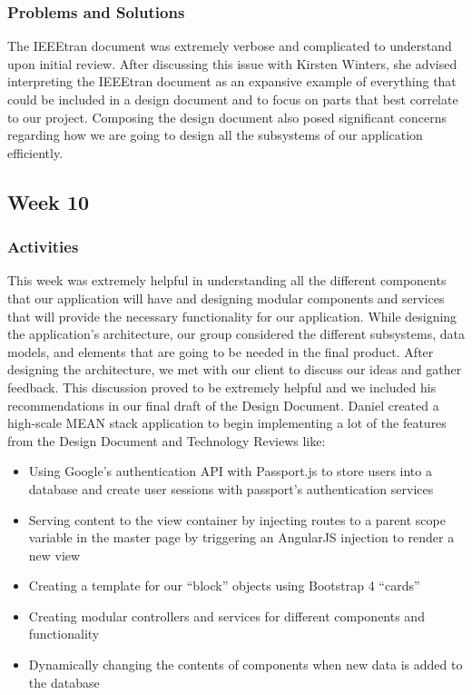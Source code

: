 \documentclass[journal,10pt,onecolumn,compsoc]{IEEEtran} \usepackage[margin=1.0in]{geometry} \usepackage{pdfpages}
\begin{document}
    \subsubsection{Problems and Solutions} 
    The IEEEtran document was extremely verbose and complicated to understand upon initial review. After discussing this issue with Kirsten Winters, she advised interpreting the IEEEtran document as an expansive example of everything that could be included in a design document and to focus on parts that best correlate to our project. Composing the design document also posed significant concerns regarding how we are going to design all the subsystems of our application efficiently.
    \subsection{Week 10}
    \subsubsection{Activities} 
    This week was extremely helpful in understanding all the different components that our application will have and designing modular components and services that will provide the necessary functionality for our application. While designing the application's architecture, our group considered the different subsystems, data models, and elements that are going to be needed in the final product. After designing the architecture, we met with our client to discuss our ideas and gather feedback. This discussion proved to be extremely helpful and we included his recommendations in our final draft of the Design Document.
    \noindent Daniel created a high-scale MEAN stack application to begin implementing a lot of the features from the Design Document and Technology Reviews like:
    \begin{itemize}
        \item Using Google’s authentication API with Passport.js to store users into a database and create user sessions with passport’s authentication services
        \item Serving content to the view container by injecting routes to a parent scope variable in the master page by triggering an AngularJS injection to render a new view
        \item Creating a template for our “block” objects using Bootstrap 4 “cards”
        \item Creating modular controllers and services for different components and functionality
        \item Dynamically changing the contents of components when new data is added to the database
    \end{itemize}
    
\end{document}
